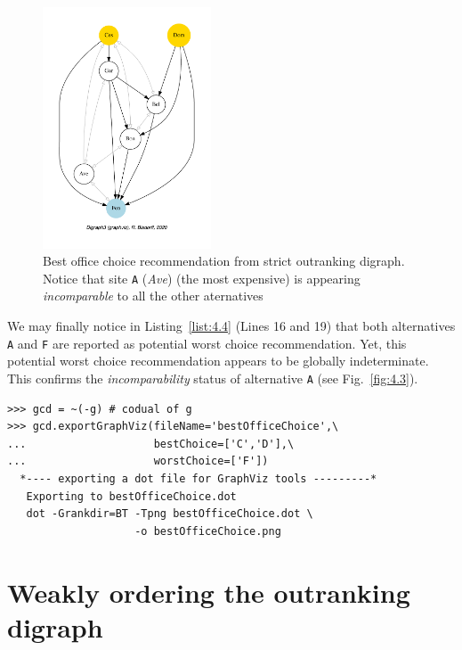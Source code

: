 \begin{figure}[h]
\sidecaption[t]
\includegraphics[width=5cm]{Figures/4-3-bestOfficeChoice.pdf}
\caption{Best office choice recommendation from strict outranking digraph. Notice that site \texttt{A} (\emph{Ave}) (the most expensive) is appearing \emph{incomparable} to all the other aternatives}
\label{fig:4.3}       %
\end{figure}
We may finally notice in Listing~\vref{list:4.4} (Lines 16 and 19) that both alternatives \texttt{A} and \texttt{F} are reported as potential worst choice recommendation. Yet, this potential worst choice recommendation appears to be globally indeterminate. This confirms the \emph{incomparability} status of alternative \texttt{A} (see Fig.~\vref{fig:4.3}).
\begin{lstlisting}
>>> gcd = ~(-g) # codual of g
>>> gcd.exportGraphViz(fileName='bestOfficeChoice',\
...                    bestChoice=['C','D'],\
...                    worstChoice=['F'])
  *---- exporting a dot file for GraphViz tools ---------*
   Exporting to bestOfficeChoice.dot
   dot -Grankdir=BT -Tpng bestOfficeChoice.dot \
                    -o bestOfficeChoice.png
\end{lstlisting}

\section{Weakly ordering the outranking digraph}
\label{sec:4.6}

